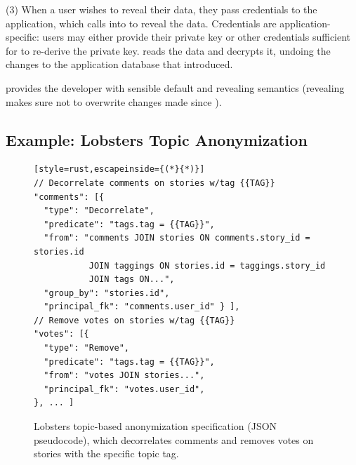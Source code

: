 %
(3) When a user wishes to reveal their \xxed data, they pass credentials
to the application, which calls into \sys to reveal the data.
%
Credentials are application-specific: users may either provide their private
key or other credentials sufficient for \sys to re-derive the private key.
%
\sys reads the \xxed data and decrypts it, undoing the changes to the
application database that \xxing introduced.

%
\sys provides the developer with sensible default \xxing and revealing
semantics (\eg revealing makes sure not to overwrite changes made since
\xxing).

\subsection{Example: Lobsters Topic Anonymization}
\label{s:design:lobsters}

\begin{figure}[t]
\centering
\begin{lstlisting}[style=rust,escapeinside={(*}{*)}]
// Decorrelate comments on stories w/tag {{TAG}}
"comments": [{
  "type": "Decorrelate",
  "predicate": "tags.tag = {{TAG}}",
  "from": "comments JOIN stories ON comments.story_id = stories.id
           JOIN taggings ON stories.id = taggings.story_id
           JOIN tags ON...",
  "group_by": "stories.id",
  "principal_fk": "comments.user_id" } ],
// Remove votes on stories w/tag {{TAG}}
"votes": [{
  "type": "Remove",
  "predicate": "tags.tag = {{TAG}}",
  "from": "votes JOIN stories...",
  "principal_fk": "votes.user_id",
}, ... ]
\end{lstlisting}
    \caption{Lobsters topic-based anonymization \xx specification (JSON
    pseudocode), which decorrelates comments and removes votes on stories with
    the specific topic tag.}
\label{f:spec}
\end{figure}

